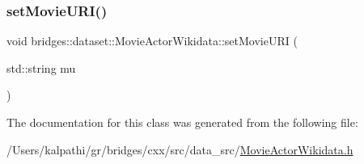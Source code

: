 \mbox{\label{classbridges_1_1dataset_1_1_movie_actor_wikidata_a0401689bb58878b12cf5e30182313129}} 
\subsubsection{\texorpdfstring{setMovieURI()}{setMovieURI()}}
{\footnotesize\ttfamily void bridges\+::dataset\+::\+Movie\+Actor\+Wikidata\+::set\+Movie\+U\+RI (\begin{DoxyParamCaption}\item[{std\+::string}]{mu }\end{DoxyParamCaption})\hspace{0.3cm}{\ttfamily [inline]}}



The documentation for this class was generated from the following file\+:\begin{DoxyCompactItemize}
\item 
/\+Users/kalpathi/gr/bridges/cxx/src/data\+\_\+src/\mbox{\hyperlink{_movie_actor_wikidata_8h}{Movie\+Actor\+Wikidata.\+h}}\end{DoxyCompactItemize}
